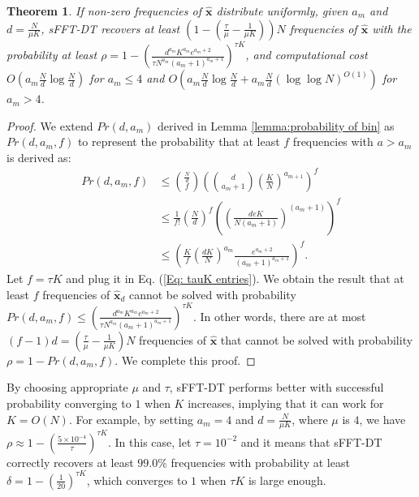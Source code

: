 \documentclass[journal,onecolumn,11pt]{IEEEtran}
\newtheorem{theorem}{Theorem}
\begin{document}
\begin{theorem}
\label{theorem:probability of sfftdt v2}
If non-zero frequencies of $\bm{\hat{x}}$ distribute uniformly, given $a_{m}$ and $d=\frac{N}{\mu K}$, sFFT-DT recovers at least $(1-(\frac{\tau}{\mu}-\frac{1}{\mu K}))N$ frequencies of $\bm{\hat{x}}$ with the probability at least $\rho = 1- \left(\frac{d^{a_{m}}K^{a_{m}}  e^{a_{m}+2}}{\tau N^{a_{m}} (a_{m}+1)^{a_{m}+1}}\right)^{\tau K}$, and computational cost $O(a_{m}\frac{N}{d}\log \frac{N}{d})$ for $a_{m}\leq 4$ and $O(a_{m}\frac{N}{d}\log \frac{N}{d}+a_{m}\frac{N}{d}(\log \log N)^{O(1)})$ for $a_{m} > 4$.
\end{theorem}
\begin{proof}
We extend $Pr(d,a_{m})$ derived in Lemma \ref{lemma:probability of bin} as $Pr(d,a_{m},f)$ to represent the probability that at least $f$ frequencies with $a > a_{m}$ is derived as:
\begin{equation}
\begin{aligned}
Pr(d,a_{m},f) & \leq \binom{\frac{N}{d}}{f}  \left(\binom{d}{a_{m}+1} (\frac{K}{N})^{a_{m+1}}\right)^{f} \\
  & \leq \frac{1}{f!}(\frac{N}{d})^{f} \left( (\frac{deK}{N(a_{m}+1)})^{(a_{m}+1)}\right)^{f} \\
  & \leq \left(\frac{K}{f}(\frac{dK}{N})^{a_{m}} \frac{e^{a_{m}+2}}{(a_{m}+1)^{a_{m}+1}}\right)^{f}.
\end{aligned}
\label{Eq: tauK entries}
\end{equation}
Let $f = \tau K$ and plug it in Eq. (\ref{Eq: tauK entries}).
We obtain the result that at least $f$ frequencies of $\bm{\hat{x}}_{d}$ cannot be solved with probability $Pr(d,a_{m},f) \leq \left(\frac{d^{a_{m}}K^{a_{m}}  e^{a_{m}+2}}{\tau N^{a_{m}} (a_{m}+1)^{a_{m}+1}}\right)^{\tau K} $.
In other words, there are at most $(f-1)d=(\frac{\tau}{\mu}-\frac{1}{\mu K})N$ frequencies of $\bm{\hat{x}}$ that cannot be solved with probability $\rho = 1 - Pr(d,a_{m},f)$.
We complete this proof.
\end{proof}
By choosing appropriate $\mu$ and $\tau$, sFFT-DT performs better with successful probability converging to $1$ when $K$ increases, implying that it can work for $K=O(N)$.
For example, by setting $a_{m}=4$ and $d=\frac{N}{\mu K}$, where $\mu$ is $4$, we have $\rho \approx 1-\left(\frac{5\times 10^{-4}}{\tau}\right)^{\tau K}$.
In this case, let $\tau=10^{-2}$ and it means that sFFT-DT correctly recovers at least $99.0\%$ frequencies with probability at least $\delta=1-(\frac{1}{20})^{\tau K}$, which converges to $1$ when $\tau K$ is large enough.
\end{document}

